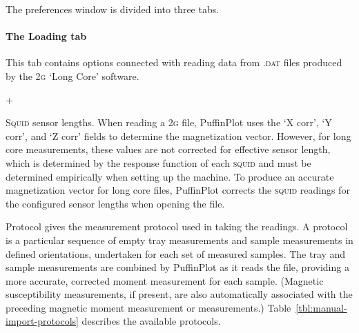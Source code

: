 \documentclass[a4paper]{article}
\newcommand{\menuitemlabel}[1]{%
\mbox{\textsf{#1}}\hfil}
\newenvironment{menuitemlist}%
{\begin{list}{}{%
\renewcommand{\makelabel}{\menuitemlabel}%
\setlength{\labelwidth}{35pt}%
\setlength{\leftmargin}%
             {\labelwidth+\labelsep}}}%
{\end{list}}
\newcommand{\ppcmd}[1]{\textsf{#1}} %
\newcommand{\caps}[1]{\textsc{#1}} %
\begin{document}
The preferences window is divided into three tabs.

\paragraph{The \ppcmd{Loading} tab}

This tab contains options connected with reading data from \caps{.dat} files
produced by the \caps{2g} `Long Core' software.

\begin{menuitemlist}

\item[\caps{Squid} sensor lengths.] When reading a \caps{2g} file, PuffinPlot
  uses the `X corr', `Y corr', and `Z corr' fields to determine the
  magnetization vector. However, for long core measurements, these values are
  not corrected for effective sensor length, which is determined by the
  response function of each \caps{squid} and must be determined empirically
  when setting up the machine. To produce an accurate magnetization vector
  for long core files, PuffinPlot corrects the \caps{squid} readings for the
  configured sensor lengths when opening the file.

\item[Protocol] gives the measurement protocol used in taking the readings. A
  protocol is a particular sequence of empty tray measurements and sample
  measurements in defined orientations, undertaken for each set of measured
  samples. The tray and sample measurements are combined by PuffinPlot as it
  reads the file, providing a more accurate, corrected moment measurement for
  each sample. (Magnetic susceptibility measurements, if present, are also
  automatically associated with the preceding magnetic moment measurement or
  measurements.) Table~\ref{tbl:manual-import-protocols} describes the
  available protocols.

\end{menuitemlist}
\end{document}
